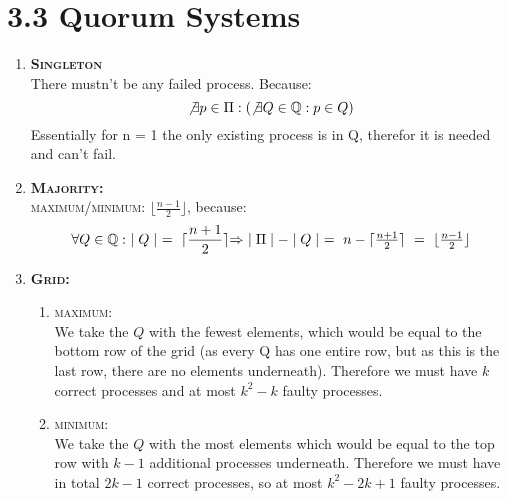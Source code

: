 \documentclass{article}
\begin{document}
	\section*{3.3 Quorum Systems}
	\begin{adjustwidth}{2em}{2em}
		\begin{enumerate}[\footnotesize{\textbullet}]
			\item \textsc{\textbf{Singleton}} \\
			There mustn't be any failed process. Because:
			\[
				\not\exists p \in \Pi : (\not\exists Q \in \mathbb{Q}: p \in Q)
            \]
            Essentially for n = 1 the only existing process is in Q, therefor it is needed and can't fail.
			\item \textsc{\textbf{Majority:}} \\
			\textsc{maximum/minimum:} $\lfloor \frac{n-1}{2} \rfloor$, because:
			\[
				\forall Q \in \mathbb{Q}: \ \mid Q \mid \ = \ \lceil \frac{n+1}{2} \rceil $$ $$
				\Rightarrow \ \mid \Pi \mid - \mid Q \mid \ = \ n - \lceil \frac{n+1}{2} \rceil \ = \ \lfloor \frac{n-1}{2} \rfloor
            \]
			\item \textsc{\textbf{Grid:}}
			\begin{enumerate}[]
				\item \textsc{maximum:} \\
				We take the $Q$ with the fewest elements, which would be equal to the bottom row of the grid (as every Q has one entire row, but as this is the last row, there are no elements underneath). Therefore we must have $k$ correct processes and at most $k^{2} - k$ faulty processes.
				\item \textsc{minimum:} \\
				We take the $Q$ with the most elements which would be equal to the top row with $k-1$ additional processes underneath. Therefore we must have in total $2k-1$ correct processes, so at most $k^{2} - 2k +1$ faulty processes.
			\end{enumerate}
		\end{enumerate}
	\end{adjustwidth}
\end{document}
